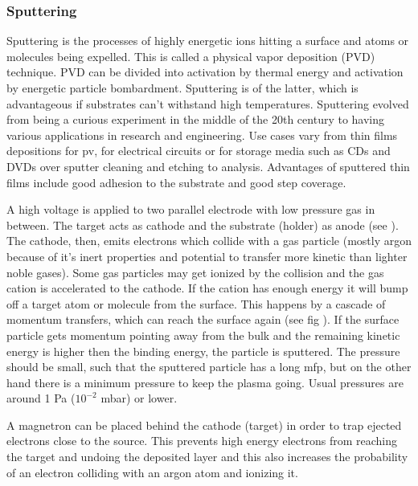 \subsubsection{Sputtering}
Sputtering is the processes of highly energetic ions hitting a surface and atoms or molecules being expelled. 
This is called a physical vapor deposition (PVD) technique. 
PVD can be divided into activation by thermal energy and activation by energetic particle bombardment. 
Sputtering is of the latter, which 
is advantageous if substrates can't withstand high temperatures.
Sputtering evolved from being a curious experiment in the middle of the 20th century to having various applications in research and engineering.
Use cases vary from thin films depositions for \gls{pv}, for electrical circuits or for storage media such as CDs and DVDs 
over sputter cleaning and etching to analysis.
Advantages of 
sputtered thin films include good adhesion to the substrate and good step coverage. 

A high voltage is applied to 
two parallel electrode with low pressure gas in between. 
The target acts as cathode and the substrate (holder) as anode (see ).
The cathode, then, emits electrons which collide with a gas particle (mostly argon because of it's inert properties and potential to transfer more kinetic than lighter noble gases). 
Some gas particles may get ionized by the collision and the gas cation is accelerated to the cathode. 
If the cation has enough energy it will bump off a target atom or molecule from the surface. 
This happens by a cascade of momentum transfers, which can reach the surface again (see fig ). 
If the surface particle gets momentum pointing away from the bulk and the remaining kinetic energy is higher then the binding energy, the particle is sputtered. 
The pressure should be small, such that the sputtered particle has a long \gls{mfp}, but on the other hand there is a minimum pressure to keep the plasma going. 
Usual pressures are around 1 Pa ($10^{-2}$ mbar) or lower\cite{Swann1988}.

A magnetron can be placed behind the cathode (target) in order to trap ejected electrons close to the source. 
This prevents high energy electrons from reaching the target and undoing the deposited layer and this also increases the probability of an electron colliding with an argon atom and ionizing it.

